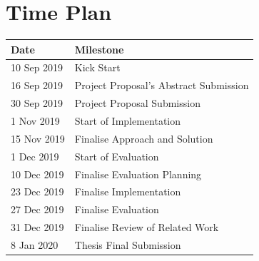 \documentclass[runningheads]{llncs}
\begin{document}
\section{Time Plan}
\begin{center}
 \begin{tabular}{| l | l |} 
 \hline
 Date & Milestone \\
 \hline
 10 Sep 2019 & Kick Start \\
 \hline
 16 Sep 2019 & Project Proposal's Abstract Submission \\
 \hline
 30 Sep 2019 & Project Proposal Submission \\  
 \hline
 1 Nov 2019 & Start of Implementation \\  
 \hline
 15 Nov 2019 & Finalise Approach and Solution \\  
 \hline
 1 Dec 2019 & Start of Evaluation \\  
 \hline
 10 Dec 2019 & Finalise Evaluation Planning \\  
 \hline
 23 Dec 2019 & Finalise Implementation \\  
 \hline
 27 Dec 2019 & Finalise Evaluation \\ 
 \hline
 31 Dec 2019 & Finalise Review of Related Work \\ 
 \hline
 8 Jan 2020 & Thesis Final Submission \\
 \hline
\end{tabular}
\end{center}
\end{document}
